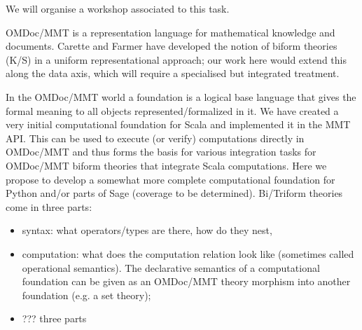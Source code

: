 \begin{workpackage}[id=dksbases,wphases=1-48!.5,
  title=Data/Knowledge/Software-Bases,lead=JU,
  ZHRM=1,JURM=36,USHRM=12,UWRM=3]
\begin{tasklist}
\begin{task}[title={Design of new infrastructure, formulation of requirements}, id=data-design]
We will organise a workshop associated to this task.
\end{task}

\begin{task}[title=Triform Theories in OMDoc/MMT,id=data-triform]
OMDoc/MMT is a representation language for mathematical knowledge and documents. Carette and Farmer have developed the notion of biform theories (K/S) in a uniform representational approach; our work here would extend this along the data axis, which will require a specialised but integrated treatment.
\end{task}

\begin{task}[title=Computational Foundation for Python/Sage (or some CAS),id=data-foundationCAS]
In the OMDoc/MMT world a foundation is a logical base language that gives the formal meaning to all objects represented/formalized in it. We have created a very initial computational foundation for Scala and implemented it in the MMT API. This can be used to execute (or verify) computations directly in OMDoc/MMT and thus forms the basis for various integration tasks for OMDoc/MMT biform theories that integrate Scala computations. Here we propose to develop a somewhat more complete computational foundation for Python and/or parts of Sage (coverage to be determined). Bi/Triform theories come in three parts:
\begin{itemize}
\item syntax: what operators/types are there, how do they nest, 
\item computation:  what does the computation relation look like (sometimes called operational semantics). The declarative semantics of a computational foundation can be given as an OMDoc/MMT theory morphism into another foundation (e.g. a set theory);
\item ??? three parts
\end{itemize}
\end{task}


\end{tasklist}
\end{workpackage}
